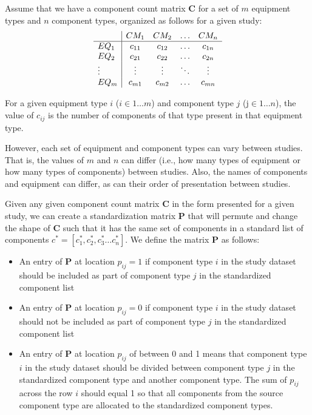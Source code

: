 \documentclass[11pt]{report}
\begin{document}
Assume that we have a component count matrix $\textbf{C}$ for a set of $m$ equipment types and $n$ component types, organized as follows for a given study:
\begin{equation}
\begin{array}{l | cccc} 
		     	&	CM_1		& CM_2 		&	\ldots&	 CM_n \\
			\hline
EQ_1			&	c_{11}	& c_{12}		&	\ldots&	c_{1n} \\
EQ_2			&	c_{21}	& c_{22}		&	\ldots&	c_{2n} \\
\vdots		&\vdots		& \vdots		& 	\ddots&	\vdots \\
EQ_m		&	c_{m1}	& c_{m2}		&	\ldots	 &	c_{mn}
\end{array}
\end{equation}


For a given equipment type $i$ ($i \in 1 \ldots m$) and component type $j$ (j$\in 1 \ldots n$), the value of $c_{ij}$ is the number of components of that type present in that equipment type.

However, each set of equipment and component types can vary between studies. That is, the values of $m$ and $n$ can differ (i.e., how many types of equipment or how many types of components) between studies. Also, the names of components and equipment can differ, as can their order of presentation between studies. 

Given any given component count matrix $\textbf{C}$ in the form presented for a given study, we can create a standardization matrix $\textbf{P}$ that will permute and change the shape of $\textbf{C}$ such that it has the same set of components in a standard list of components $c^* = [c_1^*, c_2^*, c_3^* \ldots c_n^*]$.  We define the matrix $\textbf{P}$ as follows:
\begin{itemize}
\item An entry of $\textbf{P}$ at location $p_{ij} = 1$ if component type $i$ in the study dataset should be included as part of component type $j$ in the standardized component list
\item An entry of $\textbf{P}$ at location $p_{ij} = 0$ if component type $i$ in the study dataset should not be included as part of component type $j$ in the standardized component list
\item An entry of $\textbf{P}$ at location $p_{ij}$ of between 0 and 1 means that component type $i$ in the study dataset should be divided between component type $j$ in the standardized component type and another component type. The sum of $p_{ij}$ across the row $i$ should equal 1 so that all components from the source component type are allocated to the standardized component types.
\end{itemize}
\end{document}
